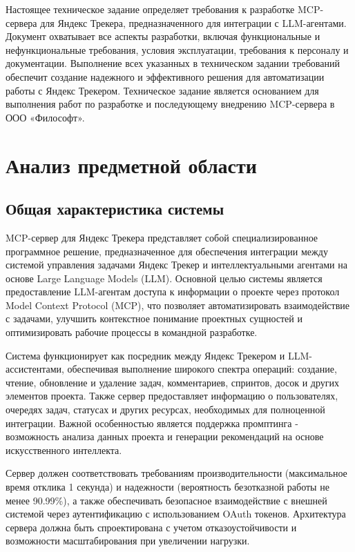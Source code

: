 \documentclass[utf8, russian]{eskdtext}
\let\stdsection\section
\renewcommand \section{\newpage\stdsection}
\begin{document}
Настоящее техническое задание определяет требования к разработке MCP-сервера для Яндекс Трекера, предназначенного для интеграции с LLM-агентами. Документ охватывает все аспекты разработки, включая функциональные и нефункциональные требования, условия эксплуатации, требования к персоналу и документации. Выполнение всех указанных в техническом задании требований обеспечит создание надежного и эффективного решения для автоматизации работы с Яндекс Трекером. Техническое задание является основанием для выполнения работ по разработке и последующему внедрению MCP-сервера в ООО «Философт».

\section{Анализ предметной области}

\subsection{Общая характеристика системы}

MCP-сервер для Яндекс Трекера представляет собой специализированное программное решение, предназначенное для обеспечения интеграции между системой управления задачами Яндекс Трекер и интеллектуальными агентами на основе Large Language Models (LLM). Основной целью системы является предоставление LLM-агентам доступа к информации о проекте через протокол Model Context Protocol (MCP), что позволяет автоматизировать взаимодействие с задачами, улучшить контекстное понимание проектных сущностей и оптимизировать рабочие процессы в командной разработке.

Система функционирует как посредник между Яндекс Трекером и LLM-ассистентами, обеспечивая выполнение широкого спектра операций: создание, чтение, обновление и удаление задач, комментариев, спринтов, досок и других элементов проекта. Также сервер предоставляет информацию о пользователях, очередях задач, статусах и других ресурсах, необходимых для полноценной интеграции. Важной особенностью является поддержка промптинга - возможность анализа данных проекта и генерации рекомендаций на основе искусственного интеллекта.

Сервер должен соответствовать требованиям производительности (максимальное время отклика 1 секунда) и надежности (вероятность безотказной работы не менее 90.99\%), а также обеспечивать безопасное взаимодействие с внешней системой через аутентификацию с использованием OAuth токенов. Архитектура сервера должна быть спроектирована с учетом отказоустойчивости и возможности масштабирования при увеличении нагрузки.
\end{document}
